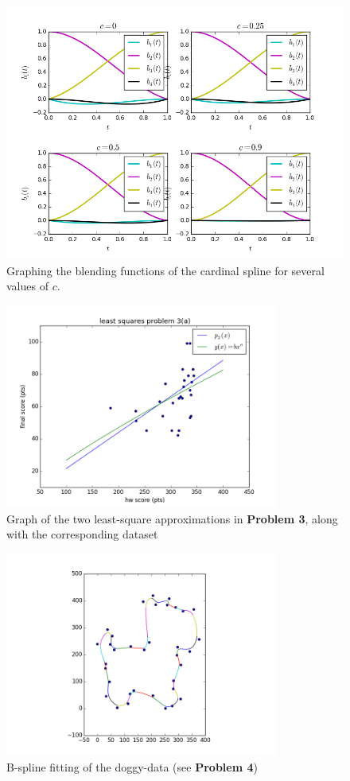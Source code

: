 \documentclass[10pt]{article}
\theoremstyle{plain}
\theoremstyle{definition}
\numberwithin{equation}{section}
\begin{document}
\begin{figure}[p]
    \begin{center}
    \includegraphics[width=.8\textwidth]{cardinals}
    \caption{Graphing the blending functions of the cardinal spline for several values of $c$.}
    \end{center}
\end{figure}

\begin{figure}[p]
    \begin{center}
        \includegraphics[width=0.8\textwidth]{p3}
        \caption{Graph of the two least-square approximations in \textbf{Problem 3},
        along with the corresponding dataset}
    \end{center}
\end{figure}

\begin{figure}[p]
    \begin{center}
    \includegraphics[width=0.8\textwidth]{doggy_splines}
    \caption{B-spline fitting of the doggy-data (see \textbf{Problem 4})}
\end{center}
\end{figure}
\end{document}
